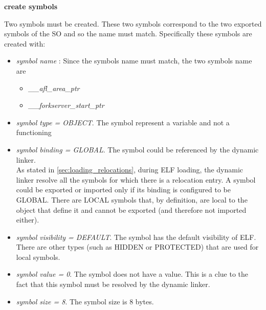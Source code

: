 \begin{center}
\textbf{create symbols}    
\end{center}
Two symbols must be created. These two symbols correspond to the two exported symbols of the \gls{SO} and so the name must 
match. Specifically these symbols are created with:
\begin{itemize}
    \item \textit{symbol name} : Since the symbols name must match, the two symbols name are \begin{itemize}
        \item \textit{\_\_afl\_area\_ptr}
        \item \textit{\_\_forkserver\_start\_ptr}
    \end{itemize}
    \item \textit{symbol type = OBJECT}. The symbol represent a variable and not a functioning
    \item \textit{symbol binding = GLOBAL}. The symbol could be referenced by the dynamic linker. \\As stated in 
        \cref{sec:loading_relocations}, during \gls{ELF} loading, the dynamic linker resolve all the symbols for which there 
        is a relocation entry. A symbol could be exported or imported only if its binding is configured to be GLOBAL.
        There are LOCAL symbols that, by definition, are local to the object that define it and cannot be exported 
        (and therefore not imported either). 
    \item \textit{symbol visibility = DEFAULT}. The symbol has the default visibility of \gls{ELF}. There are other types 
        (such as HIDDEN or PROTECTED) that are used for local symbols. 
    \item \textit{symbol value = 0}. The symbol does not have a value. This is a clue to the fact that this symbol 
    must be resolved by the dynamic linker.
    \item \textit{symbol size = 8}. The symbol size is 8 bytes.
\end{itemize} 

